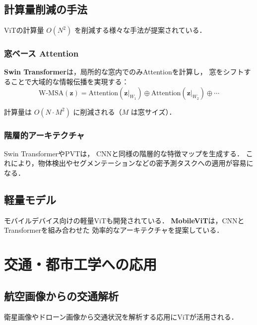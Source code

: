 \subsection{計算量削減の手法}

ViTの計算量 $O(N^2)$ を削減する様々な手法が提案されている．

\subsubsection{窓ベース Attention}

\textbf{Swin Transformer}\cite{Liu2021}は，局所的な窓内でのみAttentionを計算し，
窓をシフトすることで大域的な情報伝播を実現する：
\begin{equation}
  \mathrm{W\text{-}MSA}(\mathbf{z}) = \mathrm{Attention}(\mathbf{z}|_{W_1}) \oplus \mathrm{Attention}(\mathbf{z}|_{W_2}) \oplus \cdots
\end{equation}

計算量は $O(N \cdot M^2)$ に削減される（$M$ は窓サイズ）．

\subsubsection{階層的アーキテクチャ}

Swin TransformerやPVT\cite{Wang2021}は，
CNNと同様の階層的な特徴マップを生成する．
これにより，物体検出やセグメンテーションなどの密予測タスクへの適用が容易になる．

\subsection{軽量モデル}

モバイルデバイス向けの軽量ViTも開発されている．
\textbf{MobileViT}\cite{Mehta2022}は，CNNとTransformerを組み合わせた
効率的なアーキテクチャを提案している．

\section{交通・都市工学への応用}
\label{sec:vit-traffic}

\subsection{航空画像からの交通解析}

衛星画像やドローン画像から交通状況を解析する応用にViTが活用される．

